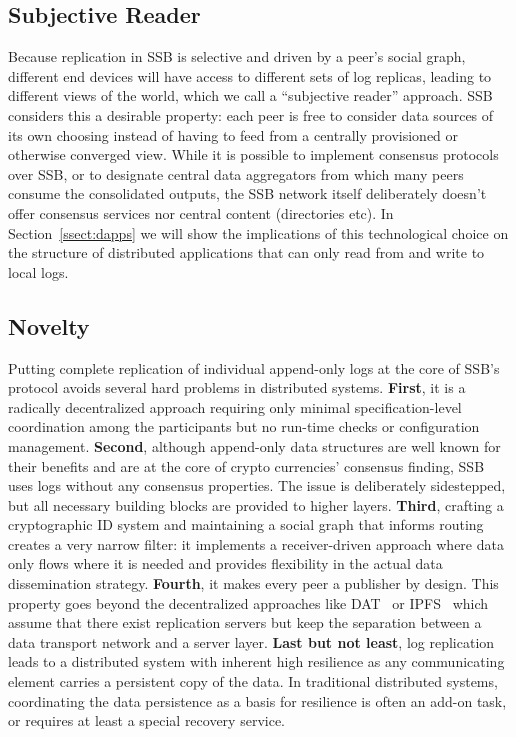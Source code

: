\documentclass[9pt,sigconf]{acmart}
\begin{document}
\subsection*{Subjective Reader}

Because replication in SSB is selective and driven by a peer's
social graph, different end devices will have access to different sets
of log replicas, leading to different views of the world, which we call
a ``subjective reader'' approach. SSB considers this a desirable
property: each peer is free to
consider data sources of its own choosing instead of having to feed
from a centrally provisioned or otherwise converged view. While it is
possible to implement consensus protocols over SSB, or to designate
central data aggregators from which many peers consume the
consolidated outputs, the SSB network itself deliberately doesn't
offer consensus services nor central content (directories etc). In
Section~\ref{ssect:dapps} we will show the implications of this
technological choice on the structure of distributed applications that
can only read from and write to local logs.

\subsection*{Novelty}

Putting complete replication of individual append-only logs at the
core of SSB's protocol avoids several hard problems in distributed
systems. {\bf First}, it is a radically decentralized approach
requiring only minimal specification-level coordination among the
participants but no run-time checks or configuration management.
%
{\bf Second}, although append-only data structures are well known for
their benefits and are at the core of crypto currencies' consensus
finding, SSB uses logs without any consensus properties. The issue is
deliberately sidestepped, but all necessary building blocks are
provided to higher layers.
%
{\bf Third}, crafting a cryptographic ID system and maintaining a
social graph that informs routing creates a very narrow filter: it
implements a receiver-driven approach where data only flows where it
is needed and provides flexibility in the actual data dissemination
strategy.
%
{\bf Fourth}, it makes every peer a publisher by design. This property
goes beyond the decentralized approaches like DAT~\cite{datproject} or
IPFS~\cite{benet2014ipfs} which assume that there exist replication
servers but keep the separation between a data transport network and a
server layer.
%
{\bf Last but not least}, log replication leads to a distributed
system with inherent high resilience as any communicating element
carries a persistent copy of the data. In traditional distributed
systems, coordinating the data persistence as a basis for resilience
is often an add-on task, or requires at least a special recovery
service.
\end{document}
